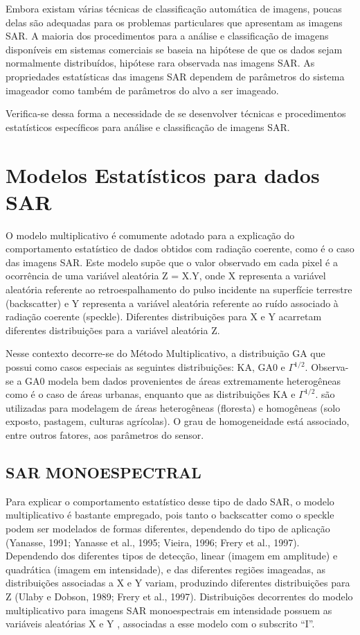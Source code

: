 \documentclass[a4paper, 12pt, english]{article}
\begin{document}
Embora existam várias técnicas de classificação automática de imagens, poucas
delas são adequadas para os problemas particulares que apresentam as imagens SAR. A
maioria dos procedimentos para a análise e classificação de imagens disponíveis em
sistemas comerciais se baseia na hipótese de que os dados sejam normalmente
distribuídos, hipótese rara observada nas imagens SAR. As propriedades estatísticas das
imagens SAR dependem de parâmetros do sistema imageador como também de
parâmetros do alvo a ser imageado.

Verifica-se dessa forma a necessidade de se desenvolver técnicas e procedimentos
estatísticos específicos para análise e classificação de imagens SAR.

\newpage
\section{Modelos Estatísticos para dados SAR}
O modelo multiplicativo é comumente adotado para a explicação do comportamento
estatístico de dados obtidos com radiação coerente, como é o caso das imagens SAR. Este
modelo supõe que o valor observado em cada pixel é a ocorrência de uma variável aleatória Z = X.Y, onde X representa a variável aleatória referente ao retroespalhamento do pulso incidente na superfície terrestre (backscatter) e Y representa a variável aleatória referente ao ruído associado à radiação coerente (speckle). Diferentes distribuições para X e Y acarretam diferentes distribuições para a variável aleatória Z.

Nesse contexto decorre-se do Método Multiplicativo, a distribuição GA que possui
como casos especiais as seguintes distribuições: KA, GA0 e $\Gamma^{1/2}$. Observa-se a GA0 modela bem dados provenientes de áreas extremamente heterogêneas como é o caso de
áreas urbanas, enquanto que as distribuições KA e $\Gamma^{1/2}$. são utilizadas para modelagem de áreas heterogêneas (floresta) e homogêneas (solo exposto, pastagem, culturas agrícolas). O grau de homogeneidade está associado, entre outros fatores, aos parâmetros do sensor.

\subsection{SAR MONOESPECTRAL}
Para explicar o comportamento estatístico desse tipo de dado SAR, o modelo multiplicativo
é bastante empregado, pois tanto o backscatter como o speckle podem ser modelados de
formas diferentes, dependendo do tipo de aplicação (Yanasse, 1991; Yanasse et al., 1995;
Vieira, 1996; Frery et al., 1997). Dependendo dos diferentes tipos de detecção, linear
(imagem em amplitude) e quadrática (imagem em intensidade), e das diferentes regiões
imageadas, as distribuições associadas a X e Y variam, produzindo diferentes distribuições
para Z (Ulaby e Dobson, 1989; Frery et al., 1997). Distribuições decorrentes do modelo
multiplicativo para imagens SAR monoespectrais em intensidade possuem as variáveis
aleatórias X e Y , associadas a esse modelo com o subscrito “I”.
\end{document}
